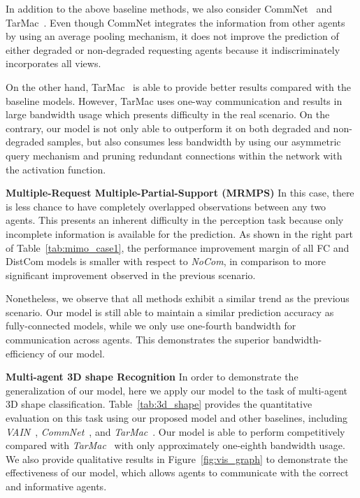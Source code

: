 In addition to the above baseline methods, we also consider CommNet~\cite{sukhbaatar2016learning} and TarMac~\cite{das2019tarmac}. 
Even though CommNet integrates the information from other agents by using an average pooling mechanism, it does not improve the prediction of either degraded or non-degraded requesting agents because it indiscriminately incorporates all views. 

On the other hand, TarMac~\cite{das2019tarmac} is able to provide better results compared with the baseline models. 
However, TarMac uses one-way communication and results in large bandwidth usage which presents difficulty in the real scenario. 
On the contrary, our model is not only able to outperform it on both degraded and non-degraded samples, but also consumes less bandwidth by using our asymmetric query mechanism and pruning redundant connections within the network with the activation function. 


\noindent
\textbf{Multiple-Request Multiple-Partial-Support (MRMPS)}
In this case, there is less chance to have completely overlapped observations between any two agents. 
This presents an inherent difficulty in the perception task because only incomplete information is available for the prediction. 
As shown in the right part of Table~\ref{tab:mimo_case1}, the performance improvement margin of all FC and DistCom models is smaller with respect to \textit{NoCom}, in comparison to more significant improvement observed in the previous scenario. 

Nonetheless, we observe that all methods exhibit a similar trend as the previous scenario. Our model is still able to maintain a similar prediction accuracy as fully-connected models, while we only use one-fourth bandwidth for communication across agents. This demonstrates the superior bandwidth-efficiency of our model.

\noindent
\textbf{Multi-agent 3D shape Recognition}
In order to demonstrate the generalization of our model, here we apply our model to the task of multi-agent 3D shape classification.
Table~\ref{tab:3d_shape} provides the quantitative evaluation on this task using our proposed model and other baselines, including \textit{VAIN}~\cite{hoshen2017vain}, \textit{CommNet}~\cite{sukhbaatar2016learning}, and \textit{TarMac}~\cite{das2019tarmac}. Our model is able to perform competitively compared with \textit{TarMac}~\cite{das2019tarmac} with only approximately one-eighth bandwidth usage. We also provide qualitative results in Figure~\ref{fig:vis_graph} to demonstrate the effectiveness of our model, which allows agents to communicate with the correct and informative agents.

